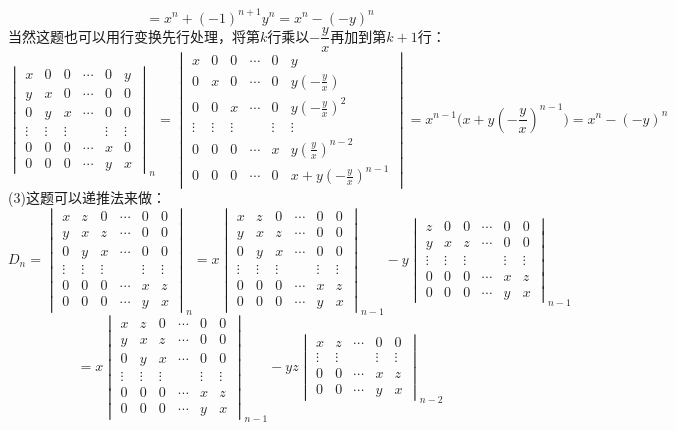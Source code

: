 \begin{solution}
\[    \]\[
    =x^n+(-1)^{n+1}y^n=x^n-(-y)^n
    \]
    当然这题也可以用行变换先行处理，将第$k$行乘以$-\dfrac{y}{x}$再加到第$k+1$行：\[
    \begin{vmatrix}x&0&0&\cdots&0&y\\y&x&0&\cdots&0&0\\0&y&x&\cdots&0&0\\\vdots&\vdots&\vdots&&\vdots&\vdots\\0&0&0&\cdots&x&0\\0&0&0&\cdots&y&x\end{vmatrix}_n
    =\begin{vmatrix}x&0&0&\cdots&0&y\\0&x&0&\cdots&0&y(-\frac{y}{x})\\0&0&x&\cdots&0&y(-\frac{y}{x})^2\\\vdots&\vdots&\vdots&&\vdots&\vdots\\0&0&0&\cdots&x&y(\frac{y}{x})^{n-2}\\0&0&0&\cdots&0&x+y(-\frac{y}{x})^{n-1}\end{vmatrix}
    =x^{n-1}\bigg(x+y(-\dfrac{y}{x})^{n-1}\bigg)=x^n-(-y)^n\]
    (3)这题可以递推法来做：\[D_n=
    \begin{vmatrix}x&z&0&\cdots&0&0\\y&x&z&\cdots&0&0\\0&y&x&\cdots&0&0\\\vdots&\vdots&\vdots&&\vdots&\vdots\\0&0&0&\cdots&x&z\\0&0&0&\cdots&y&x\end{vmatrix}_n
    =x\begin{vmatrix}x&z&0&\cdots&0&0\\y&x&z&\cdots&0&0\\0&y&x&\cdots&0&0\\\vdots&\vdots&\vdots&&\vdots&\vdots\\0&0&0&\cdots&x&z\\0&0&0&\cdots&y&x\end{vmatrix}_{n-1}-y\begin{vmatrix}z&0&0&\cdots&0&0\\y&x&z&\cdots&0&0\\\vdots&\vdots&\vdots&&\vdots&\vdots\\0&0&0&\cdots&x&z\\0&0&0&\cdots&y&x\end{vmatrix}_{n-1}
    \]\[
    =x\begin{vmatrix}x&z&0&\cdots&0&0\\y&x&z&\cdots&0&0\\0&y&x&\cdots&0&0\\\vdots&\vdots&\vdots&&\vdots&\vdots\\0&0&0&\cdots&x&z\\0&0&0&\cdots&y&x\end{vmatrix}_{n-1}-yz\begin{vmatrix}x&z&\cdots&0&0\\\vdots&\vdots&&\vdots&\vdots\\0&0&\cdots&x&z\\0&0&\cdots&y&x\end{vmatrix}_{n-2}
\]
\end{solution}
